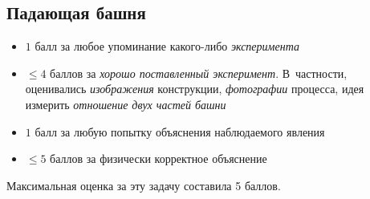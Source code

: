 \documentclass[10pt, a4paper, oneside, fleqn]{article}
\newcommand\т{~--- }
\def\le{\leqslant}
\begin{document}
\subsection{Падающая башня}

\begin{itemize}
\item $1$ балл за любое упоминание какого-либо \emph{эксперимента}
\item $\le 4$ баллов за \emph{хорошо поставленный эксперимент}.
В~частности, оценивались \emph{изображения} конструкции, \emph{фотографии} процесса,
идея измерить \emph{отношение двух частей башни}
\item $1$ балл за любую попытку объяснения наблюдаемого явления
\item $\le 5$ баллов за физически корректное объяснение
\end{itemize}
Максимальная оценка за эту задачу составила 5 баллов.
\end{document}
